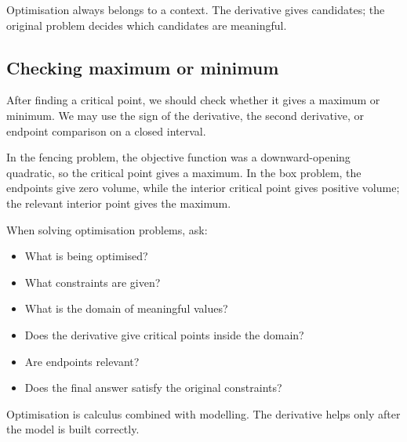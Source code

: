 \begin{remarkbox}
Optimisation always belongs to a context. The derivative gives candidates; the original problem decides which candidates are meaningful.
\end{remarkbox}

\subsection*{Checking maximum or minimum}

After finding a critical point, we should check whether it gives a maximum or minimum. We may use the sign of the derivative, the second derivative, or endpoint comparison on a closed interval.

In the fencing problem, the objective function was a downward-opening quadratic, so the critical point gives a maximum. In the box problem, the endpoints give zero volume, while the interior critical point gives positive volume; the relevant interior point gives the maximum.

\begin{summarybox}
When solving optimisation problems, ask:
\begin{itemize}
\item What is being optimised?
\item What constraints are given?
\item What is the domain of meaningful values?
\item Does the derivative give critical points inside the domain?
\item Are endpoints relevant?
\item Does the final answer satisfy the original constraints?
\end{itemize}
\end{summarybox}

Optimisation is calculus combined with modelling. The derivative helps only after the model is built correctly.